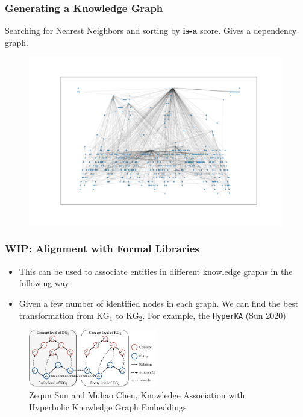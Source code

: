 \documentclass[10pt]{beamer}
\begin{document}

\begin{frame}
    \frametitle{Generating a Knowledge Graph}
    Searching for Nearest Neighbors and sorting by \textbf{is-a} score. Gives a dependency graph.
            \begin{figure}
                \centering
                \includegraphics[width=0.99\textwidth]{../Images/number_theory_dgraph.png}
            \end{figure}
\end{frame}


\begin{frame}
    \frametitle{WIP: Alignment with Formal Libraries}
    \begin{itemize}
        \item This can be used to associate entities in different knowledge graphs in the following way:
            \pause
        \item Given a few number of identified nodes in each graph. We can find the best transformation from KG$_1$ to KG$_2$. For example, 
            the \texttt{HyperKA} (Sun 2020)
    \end{itemize}
            \begin{figure}
                \centering
                \includegraphics[width=0.5\textwidth]{../Images/example.png}
                \caption{Zequn Sun and Muhao Chen, Knowledge Association with Hyperbolic Knowledge Graph Embeddings}
            \end{figure}
\end{frame}
\end{document}
